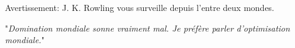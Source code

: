 Avertissement: J. K. Rowling vous surveille depuis l'entre deux mondes.


"\emph{Domination mondiale sonne vraiment mal. Je préfère parler d'optimisation mondiale.}"

